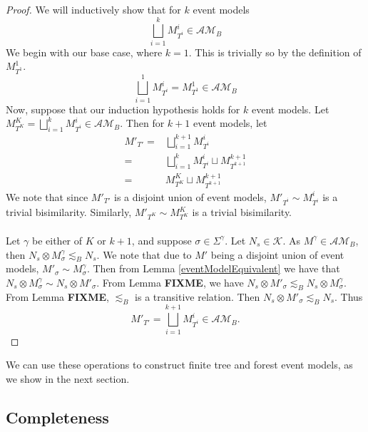\documentclass[12pt, a4paper, titlepage]{scrartcl}
\numberwithin{equation}{section}
\newcommand{\kripkeClass}{\mathcal{K}}
\newcommand{\eventClass}{\mathcal{AM}}
\newcommand{\FIXME}{{\bf FIXME}}
\begin{document}
\begin{proof}
We will inductively show that for $k$ event models
\[
	\bigsqcup_{i = 1}^k M^i_{T^i} \in \eventClass_B
\]
We begin with our base case, where $k = 1$.
This is trivially so by the definition of $M^1_{T^1}$.
\[
	\bigsqcup_{i = 1}^1 M^i_{T^i} = M^1_{T^1} \in \eventClass_B
\]
Now, suppose that our induction hypothesis holds for $k$ event models.
Let $M^K_{T^K} = \bigsqcup_{i = 1}^k M^i_{T^i} \in \eventClass_B$.
Then for $k+1$ event models, let
\begin{align*}
	M'_{T'} = & \bigsqcup_{i = 1}^{k+1} M^i_{T^i} \\
	= & \bigsqcup_{i = 1}^k M^i_{T^i} \sqcup M^{k+1}_{T^{k+1}} \\
	= & M^K_{T^K} \sqcup M^{k+1}_{T^{k+1}}
\end{align*}
We note that since $M'_{T'}$ is a disjoint union of event models, $M'_{T^i} \sim M^i_{T^i}$ is a
trivial bisimilarity.
Similarly, $M'_{T^K} \sim M^K_{T^K}$ is a trivial bisimilarity.\\
\\
Let $\gamma$ be either of $K$ or $k+1$, and suppose $\sigma \in \Sigma^\gamma$.
Let $N_s \in \kripkeClass$.
As $M^\gamma \in \eventClass_B$, then $N_s \otimes M^\gamma_\sigma \lesssim_B N_s$.
We note that due to $M'$ being a disjoint union of event models, $M'_\sigma \sim M^\gamma_\sigma$.
Then from Lemma \ref{eventModelEquivalent} we have that $N_s \otimes M^\gamma_\sigma \sim N_s
\otimes M'_\sigma$.
From Lemma \FIXME, we have $N_s \otimes M'_\sigma \lesssim_B N_s \otimes M^\gamma_\sigma$.
From Lemma \FIXME, $\lesssim_B$ is a transitive relation.
Then $N_s \otimes M'_\sigma \lesssim_B N_s$.
Thus
\[
M'_{T'} = \bigsqcup_{i = 1}^{k+1} M^i_{T^i} \in \eventClass_B.
\]
\end{proof}

We can use these operations to construct finite tree and forest event models, as we show
in the next section.

\subsection{Completeness}
\end{document}
